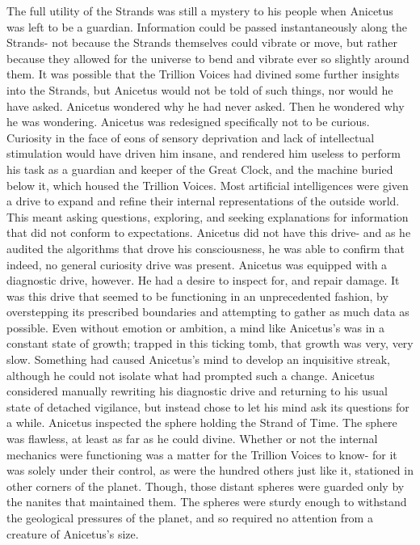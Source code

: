 \documentclass[a4paper]{article}
\begin{document}
The full utility of the Strands was still a mystery to his people when Anicetus was left to be a guardian. Information could be passed instantaneously along the Strands- not because the Strands themselves could vibrate or move, but rather because they allowed for the universe to bend and vibrate ever so slightly around them. It was possible that the Trillion Voices had divined some further insights into the Strands, but Anicetus would not be told of such things, nor would he have asked.
Anicetus wondered why he had never asked. Then he wondered why he was wondering. Anicetus was redesigned specifically not to be curious. Curiosity in the face of eons of sensory deprivation and lack of intellectual stimulation would have driven him insane, and rendered him useless to perform his task as a guardian and keeper of the Great Clock, and the machine buried below it, which housed the Trillion Voices.
Most artificial intelligences were given a drive to expand and refine their internal representations of the outside world. This meant asking questions, exploring, and seeking explanations for information that did not conform to expectations. Anicetus did not have this drive- and as he audited the algorithms that drove his consciousness, he was able to confirm that indeed, no general curiosity drive was present.
Anicetus was equipped with a diagnostic drive, however. He had a desire to inspect for, and repair damage. It was this drive that seemed to be functioning in an unprecedented fashion, by overstepping its prescribed boundaries and attempting to gather as much data as possible.
Even without emotion or ambition, a mind like Anicetus’s was in a constant state of growth; trapped in this ticking tomb, that growth was very, very slow. Something had caused Anicetus’s mind to develop an inquisitive streak, although he could not isolate what had prompted such a change. Anicetus considered manually rewriting his diagnostic drive and returning to his usual state of detached vigilance, but instead chose to let his mind ask its questions for a while.
Anicetus inspected the sphere holding the Strand of Time. The sphere was flawless, at least as far as he could divine. Whether or not the internal mechanics were functioning was a matter for the Trillion Voices to know- for it was solely under their control, as were the hundred others just like it, stationed in other corners of the planet. Though, those distant spheres were guarded only by the nanites that maintained them. The spheres were sturdy enough to withstand the geological pressures of the planet, and so required no attention from a creature of Anicetus’s size.
\end{document}
